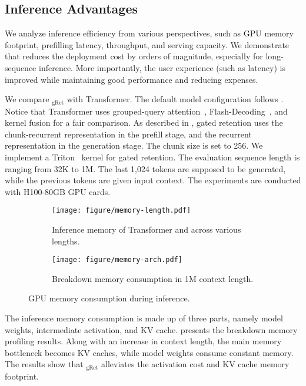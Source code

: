 \subsection{Inference Advantages}
\label{sec:exp:infer}

We analyze inference efficiency from various perspectives, such as GPU memory footprint, prefilling latency, throughput, and serving capacity.
We demonstrate that \our{} reduces the deployment cost by orders of magnitude, especially for long-sequence inference.
More importantly, the user experience (such as latency) is improved while maintaining good performance and reducing expenses.

We compare \our{}$_\text{gRet}$ with Transformer. The default model configuration follows .
Notice that Transformer uses grouped-query attention~\cite{gqa}, Flash-Decoding~\cite{flashdec}, and kernel fusion for a fair comparison.
As described in , gated retention uses the chunk-recurrent representation in the prefill stage, and the recurrent representation in the generation stage.
The chunk size is set to 256.
We implement a Triton~\cite{triton} kernel for gated retention.
The evaluation sequence length is ranging from 32K to 1M.
The last 1,024 tokens are supposed to be generated, while the previous tokens are given input context.
The experiments are conducted with H100-80GB GPU cards.

\begin{figure*}[t]
\centering
\begin{subfigure}[c]{0.7\textwidth}
\centering
\texttt{[image: figure/memory-length.pdf]}
\caption{Inference memory of Transformer and \our{} across various lengths.
}
\label{fig:memory-length}
\end{subfigure}
\hfill
\begin{subfigure}[c]{0.28\textwidth}
\centering
\texttt{[image: figure/memory-arch.pdf]}
\caption{Breakdown memory consumption in 1M context length.
}
\label{fig:memorybar}
\end{subfigure}
\caption{GPU memory consumption during inference.}
\label{fig:memory}
\end{figure*}

The inference memory consumption is made up of three parts, namely model weights, intermediate activation, and KV cache.
 presents the breakdown memory profiling results.
Along with an increase in context length, the main memory bottleneck becomes KV caches, while model weights consume constant memory.
The results show that \our{}$_\text{gRet}$ alleviates the activation cost and KV cache memory footprint.

